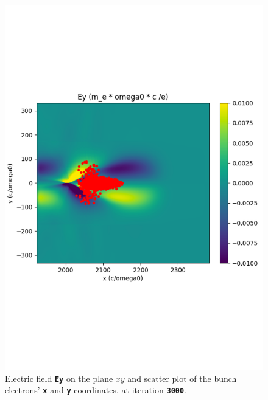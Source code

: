 \documentclass[a4paper,12pt]{extarticle}
\newcommand{\commandline}[1]{\texttt{\textbf{#1}}}
\begin{document}
\begin{figure}[!htb]
\begin{minipage}{0.48\textwidth}
     \includegraphics[width=1\linewidth]{EyScatterXY.pdf}
     \caption{Electric field \commandline{Ey} on the plane $xy$ and scatter plot of the bunch electrons' \commandline{x} and \commandline{y} coordinates, at iteration \commandline{3000}. }\label{EyScatterXY}
   \end{minipage}
\end{figure}


\appendix
\end{document}
